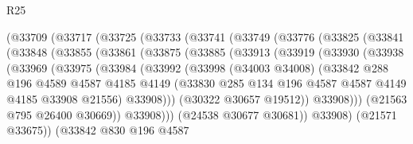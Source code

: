 \begin{lexlean}{R25}
\begin{coremodule}
        (@33709
          (@33717
            (@33725
              (@33733
                (@33741
                  (@33749
                    (@33776
                      (@33825
                        (@33841
                          (@33848
                            (@33855
                              (@33861
                                (@33875
                                  (@33885
                                    (@33913
                                      (@33919
                                        (@33930
                                          (@33938
                                            (@33969
                                              (@33975
                                                (@33984
                                                  (@33992
                                                    (@33998
                                                      (@34003 @34008)
                                                      (@33842
                                                        @288
                                                        @196
                                                        @4589
                                                        @4587
                                                        @4185
                                                        @4149
                                                        (@33830
                                                          @285
                                                          @134
                                                          @196
                                                          @4587
                                                          @4587
                                                          @4149
                                                          @4185
                                                          @33908
                                                          @21556)
                                                        @33908)))
                                                  (@30322 @30657 @19512))
                                                @33908)))
                                          (@21563 @795 @26400 @30669))
                                        @33908)))
                                  (@24538 @30677 @30681))
                                @33908)
                              (@21571 @33675))
                            (@33842
                              @830
                              @196
                              @4587

\end{coremodule}
\end{lexlean}

